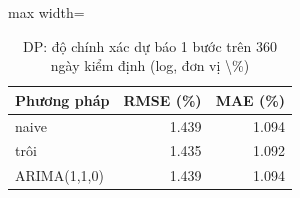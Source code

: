 \begin{table}[H]
\centering\small
\caption{DP: độ chính xác dự báo 1 bước trên 360 ngày kiểm định (log, đơn vị \textbackslash{}\%)}\label{tab:tab_b12_11_dp_one_step}
\begin{adjustbox}{max width=\linewidth}
\begin{tabular}{lrr}
\toprule
Phương pháp & RMSE (\%) & MAE (\%) \\
\midrule
naive & 1.439 & 1.094 \\
trôi & 1.435 & 1.092 \\
ARIMA(1,1,0) & 1.439 & 1.094 \\
\bottomrule
\end{tabular}
\end{adjustbox}
\end{table}
